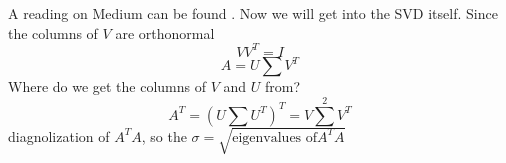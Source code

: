 A reading on Medium can be found . Now we will get into the SVD itself. Since the columns of $V$ are orthonormal\markdownRendererEllipsis{}\markdownRendererInterblockSeparator
{}$$VV^T=I$$\markdownRendererInterblockSeparator
{}$$A = U\sum V^T$$\markdownRendererInterblockSeparator
{}Where do we get the columns of $V$ and $U$ from?\markdownRendererInterblockSeparator
{}$$A^T = (U\sum U^T)^T=V\sum^2 V^T$$\markdownRendererInterblockSeparator
{}diagnolization of $A^TA$, so the $\sigma=\sqrt{\text{eigenvalues of}A^TA}$\relax